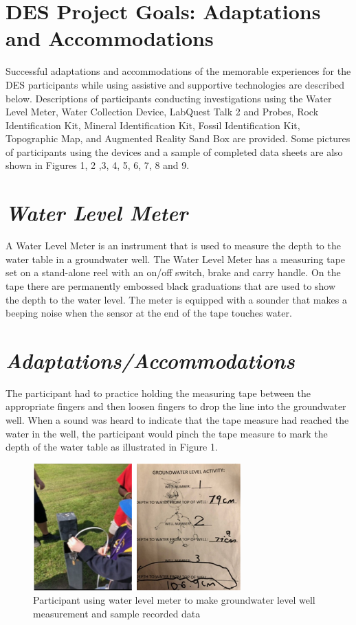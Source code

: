 \documentclass[11.5pt]{sig-alternate}
\begin{document}
\begin{large}
\section*{DES Project Goals: Adaptations and Accommodations}

Successful adaptations and accommodations of the memorable experiences for the DES participants while using assistive and supportive technologies are described below. Descriptions of participants conducting investigations using the Water Level Meter, Water Collection Device, LabQuest Talk 2 and Probes, Rock Identification Kit, Mineral Identification Kit, Fossil Identification Kit, Topographic Map, and Augmented Reality Sand Box are provided.  Some pictures of participants using the devices and a sample of completed data sheets are also shown in Figures 1, 2 ,3, 4, 5, 6, 7, 8 and 9.

\section*{\textit{Water Level Meter}}

A Water Level Meter is an instrument that is used to measure the depth to the water table in a groundwater well. The Water Level Meter has a measuring tape set on a stand-alone reel with an on/off switch, brake and carry handle. On the tape there are permanently embossed black graduations that are used to show the depth to the water level. The meter is equipped with a sounder that makes a beeping noise when the sensor at the end of the tape touches water.

\section*{\textit{Adaptations/Accommodations}}

The participant had to practice holding the measuring tape between the appropriate fingers and then loosen fingers to drop the line into the groundwater well.  When a sound was heard to indicate that the tape measure had reached the water in the well, the participant would pinch the tape measure to mark the depth of the water table as illustrated in Figure 1.
\\
\begin{figure}[htp] 
    \centering
    \includegraphics[width=8cm]{figure1.png}
    \caption{Participant using water level meter to make  groundwater level well measurement and sample recorded data }
    \label{hands-on Bohr model using Styrofoam}
\end{figure}



\end{large}
\end{document}
